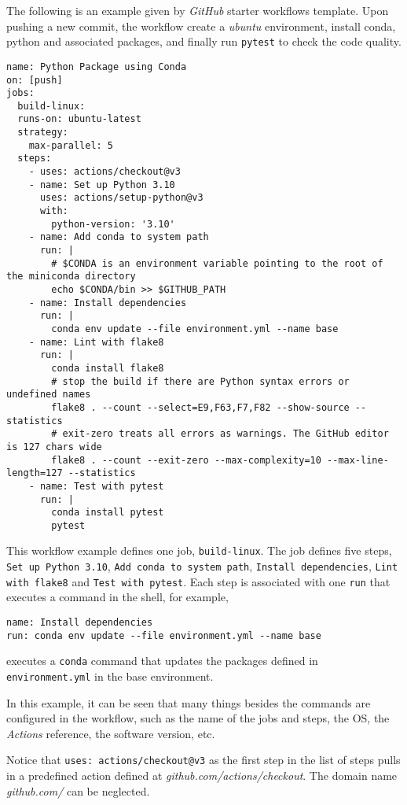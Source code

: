 The following is an example given by \textit{GitHub} starter workflows template. Upon pushing a new commit, the workflow create a \textit{ubuntu} environment, install conda, python and associated packages, and finally run \verb|pytest| to check the code quality. \label{code:pythonpackageusingconda}
\begin{lstlisting}
name: Python Package using Conda
on: [push]
jobs:
  build-linux:
  runs-on: ubuntu-latest
  strategy:
    max-parallel: 5
  steps:
    - uses: actions/checkout@v3
    - name: Set up Python 3.10
      uses: actions/setup-python@v3
      with:
        python-version: '3.10'
    - name: Add conda to system path
      run: |
        # $CONDA is an environment variable pointing to the root of the miniconda directory
        echo $CONDA/bin >> $GITHUB_PATH
    - name: Install dependencies
      run: |
        conda env update --file environment.yml --name base
    - name: Lint with flake8
      run: |
        conda install flake8
        # stop the build if there are Python syntax errors or undefined names
        flake8 . --count --select=E9,F63,F7,F82 --show-source --statistics
        # exit-zero treats all errors as warnings. The GitHub editor is 127 chars wide
        flake8 . --count --exit-zero --max-complexity=10 --max-line-length=127 --statistics
    - name: Test with pytest
      run: |
        conda install pytest
        pytest

\end{lstlisting}

This workflow example defines one job, \verb|build-linux|. The job defines five steps, \verb|Set up Python 3.10|, \verb|Add conda to system path|, \verb|Install dependencies|, \verb|Lint with flake8| and \verb|Test with pytest|. Each step is associated with one \verb|run| that executes a command in the shell, for example,
\begin{lstlisting}
name: Install dependencies
run: conda env update --file environment.yml --name base
\end{lstlisting}
executes a \verb|conda| command that updates the packages defined in \verb|environment.yml| in the base environment.

In this example, it can be seen that many things besides the commands are configured in the workflow, such as the name of the jobs and steps, the OS, the \textit{Actions} reference, the software version, etc.

Notice that \verb|uses: actions/checkout@v3| as the first step in the list of steps pulls in a predefined action defined at \textit{github.com/actions/checkout}. The domain name \textit{github.com/} can be neglected.


